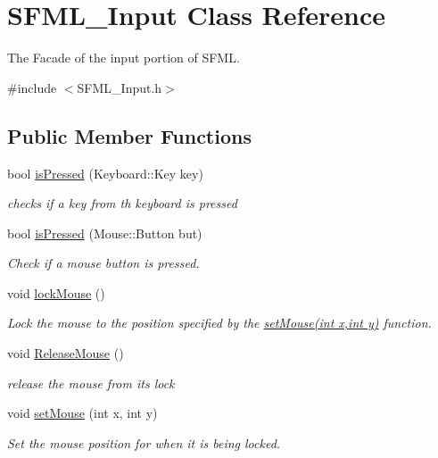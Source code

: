 \hypertarget{class_s_f_m_l___input}{\section{S\-F\-M\-L\-\_\-\-Input Class Reference}
\label{class_s_f_m_l___input}
}


The Facade of the input portion of S\-F\-M\-L.  




{\ttfamily \#include $<$S\-F\-M\-L\-\_\-\-Input.\-h$>$}

\subsection*{Public Member Functions}
\begin{DoxyCompactItemize}
\item 
bool \hyperlink{class_s_f_m_l___input_a502a178db8476cee4885c8ca98942840}{is\-Pressed} (Keyboard\-::\-Key key)
\begin{DoxyCompactList}\small\item\em checks if a key from th keyboard is pressed \end{DoxyCompactList}\item 
bool \hyperlink{class_s_f_m_l___input_a070bf3a2362b9e0ac9288e3c06e474b0}{is\-Pressed} (Mouse\-::\-Button but)
\begin{DoxyCompactList}\small\item\em Check if a mouse button is pressed. \end{DoxyCompactList}\item 
void \hyperlink{class_s_f_m_l___input_a30d660f643a41aa76689ba5f89d459a3}{lock\-Mouse} ()
\begin{DoxyCompactList}\small\item\em Lock the mouse to the position specified by the \hyperlink{class_s_f_m_l___input_a06a45c6f02890f93854f57b3ed2656a8}{set\-Mouse(int x,int y)} function. \end{DoxyCompactList}\item 
void \hyperlink{class_s_f_m_l___input_aa4b918ee8382dbf7f2fdf1f67032505b}{Release\-Mouse} ()
\begin{DoxyCompactList}\small\item\em release the mouse from its lock \end{DoxyCompactList}\item 
void \hyperlink{class_s_f_m_l___input_a06a45c6f02890f93854f57b3ed2656a8}{set\-Mouse} (int x, int y)
\begin{DoxyCompactList}\small\item\em Set the mouse position for when it is being locked. \end{DoxyCompactList}\item 

\end{DoxyCompactItemize}
